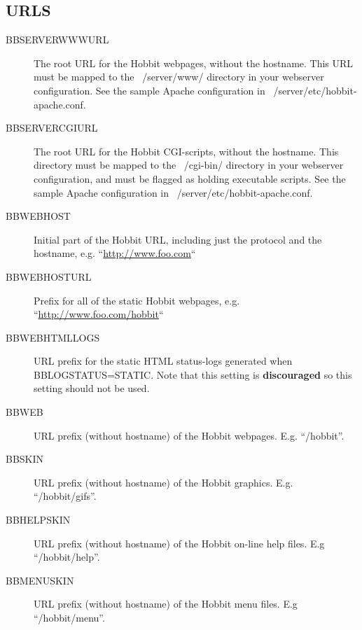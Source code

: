 \subsection{URLS}
\begin{description}
\item[BBSERVERWWWURL] The root URL for the Hobbit webpages, without the hostname. This URL must be mapped to the ~/server/www/ directory in your webserver configuration. See the sample Apache configuration in ~/server/etc/hobbit-apache.conf. 

 

\item[BBSERVERCGIURL] The root URL for the Hobbit CGI-scripts, without the hostname. This directory must be mapped to the ~/cgi-bin/ directory in your webserver configuration, and must be flagged as holding executable scripts. See the sample Apache configuration in ~/server/etc/hobbit-apache.conf. 

 

\item[BBWEBHOST] Initial part of the Hobbit URL, including just the protocol and the hostname, e.g. ``\url{http://www.foo.com}`` 

 

\item[BBWEBHOSTURL] Prefix for all of the static Hobbit webpages, e.g. ``\url{http://www.foo.com/hobbit}`` 

 

\item[BBWEBHTMLLOGS] URL prefix for the static HTML status-logs generated when BBLOGSTATUS=STATIC. Note that this setting is \textbf{discouraged}
 so this setting should not be used. 

 

\item[BBWEB] URL prefix (without hostname) of the Hobbit webpages. E.g. ``/hobbit''. 

 

\item[BBSKIN] URL prefix (without hostname) of the Hobbit graphics. E.g. ``/hobbit/gifs''. 

 

\item[BBHELPSKIN] URL prefix (without hostname) of the Hobbit on-line help files. E.g ``/hobbit/help''. 

 

\item[BBMENUSKIN] URL prefix (without hostname) of the Hobbit menu files. E.g ``/hobbit/menu''. 


\end{description}
